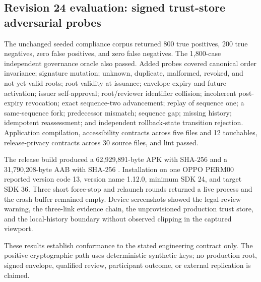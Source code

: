 

\subsection{Revision 24 evaluation: signed trust-store adversarial probes}

The unchanged seeded compliance corpus returned 800 true positives, 200 true negatives, zero false positives, and zero false negatives. The 1,800-case independent governance oracle also passed. Added probes covered canonical order invariance; signature mutation; unknown, duplicate, malformed, revoked, and not-yet-valid roots; root validity at issuance; envelope expiry and future activation; issuer self-approval; root/reviewer identifier collision; incoherent post-expiry revocation; exact sequence-two advancement; replay of sequence one; a same-sequence fork; predecessor mismatch; sequence gap; missing history; idempotent reassessment; and independent rollback-state transition rejection. Application compilation, accessibility contracts across five files and 12 touchables, release-privacy contracts across 30 source files, and lint passed.

The release build produced a 62,929,891-byte APK with SHA-256 \texttt{} and a 31,790,208-byte AAB with SHA-256 \texttt{}. Installation on one OPPO PERM00 reported version code 13, version name 1.12.0, minimum SDK 24, and target SDK 36. Three short force-stop and relaunch rounds returned a live process and the crash buffer remained empty. Device screenshots showed the legal-review warning, the three-link evidence chain, the unprovisioned production trust store, and the local-history boundary without observed clipping in the captured viewport.

These results establish conformance to the stated engineering contract only. The positive cryptographic path uses deterministic synthetic keys; no production root, signed envelope, qualified review, participant outcome, or external replication is claimed.
